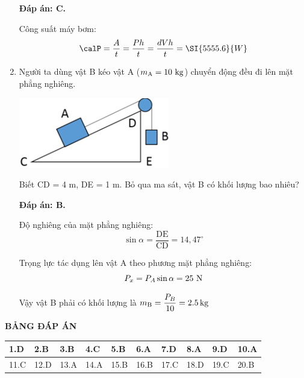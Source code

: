 \begin{enumerate}[label=\bfseries Câu \arabic*:]
{	}
	
	\hideall
	{\textbf{Đáp án: C.}
		
		Công suất máy bơm:
		$$\calP = \dfrac{A}{t} = \dfrac{Ph}{t} = \dfrac{dVh}{t} = \SI{5555.6}{W}$$
	}
	\item {}
	
	
	{Người ta dùng vật B kéo vật A ($m_\text A = 10\ \text{kg}$) chuyển động đều đi lên mặt phẳng nghiêng.
		\begin{center}
			\includegraphics[scale=1]{../figs/VN10-2021-PH-TP0003-1.png}
		\end{center}
		Biết CD = 4 m, DE = 1 m. Bỏ qua ma sát, vật B có khối lượng bao nhiêu?
		
	}
	
	\hideall
	{\textbf{Đáp án: B.}
		
		Độ nghiêng của mặt phẳng nghiêng:
		$$\sin \alpha = \dfrac{\text{DE}}{\text{CD}} = 14,47^\circ$$
		
		Trọng lực tác dụng lên vật A theo phương mặt phẳng nghiêng:
		$$P_x=P_A \sin \alpha = 25\ \text N$$
		
		Vậy vật B phải có khối lượng là $m_\text B = \dfrac{P_B}{10} = \SI{2.5}{kg}$
	}
	
\end{enumerate}


\hideall
{
	\begin{center}
		\textbf{BẢNG ĐÁP ÁN}
	\end{center}
	\begin{center}
		\begin{tabular}{|m{2.8em}|m{2.8em}|m{2.8em}|m{2.8em}|m{2.8em}|m{2.8em}|m{2.8em}|m{2.8em}|m{2.8em}|m{2.8em}|}
			\hline
			1.D  & 2.B  & 3.B  & 4.C  & 5.B  & 6.A  & 7.D  & 8.A  & 9.D  & 10.A  \\
			\hline
			11.C  & 12.D  & 13.A  & 14.A  & 15.B  & 16.B  & 17.C  & 18.D  & 19.C  & 20.B  \\
			\hline
			
		\end{tabular}
	\end{center}
}
